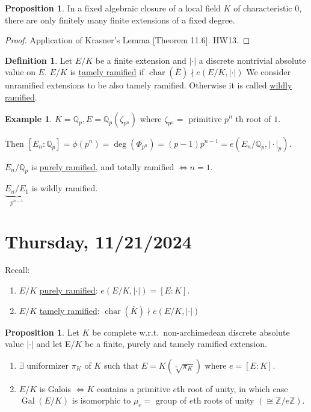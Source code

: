 \documentclass[openany]{amsbook}
\numberwithin{section}{chapter}
\theoremstyle{definition}
\newtheorem*{example}{Example}
\newtheorem*{definition}{Definition}
\newtheorem{proposition}[theorem]{Proposition}
\begin{document}
\begin{proposition}
    In a fixed algebraic closure of a local field \(K\) of characteristic \(0\), there are only finitely many finite extensions of a fixed degree.
\end{proposition}

\begin{proof}
    Application of Krasner's Lemma [Theorem 11.6]. HW13.
\end{proof}

\begin{definition}
    Let \(E / K\) be a finite extension and \(\vert \cdot \vert \) a discrete nontrivial absolute value on \(E\). \(E / K\) is \underline{tamely ramified} if \(\operatorname{char}(\overline{E}) \nmid e(E / K, \vert \cdot \vert)\) We consider unramified extensions to be also tamely ramified. Otherwise it is called \underline{wildly ramified}. 
\end{definition}

\begin{example}
    \(K = \mathbb{Q}_p, E = \mathbb{Q}_p(\zeta_{p^n})\) where \(\zeta_{p^n}=\) primitive \(p^n\) th root of \(1\).
    
    Then \([E_n:\mathbb{Q}_p] = \phi(p^n)=\deg(\Phi_{p^n})=(p-1)p^{n-1} = e(E_n / \mathbb{Q}_p, \vert \cdot \vert_p)\).
    
    \(E_n / \mathbb{Q}_p\) is \underline{purely ramified}, and totally ramified \(\iff n = 1\).

    \(\underbrace{E_n / E_1}_{p^{n-1}}\) is wildly ramified. 
\end{example}

\section*{Thursday, 11/21/2024}

Recall:

\begin{enumerate}[label=\roman*)]
    \item \(E / K\) \underline{purely ramified}: \(e(E / K, \vert \cdot \vert ) = [E:K]\).
    \item \(E / K\) \underline{tamely ramified}: \(\operatorname{char}(\overline{K}) \nmid e(E / K, \vert \cdot \vert)\)   
\end{enumerate} 

\begin{proposition}
    Let \(K\) be complete w.r.t.\ non-archimedean discrete absolute value \(\vert \cdot \vert \) and let E\( / K\) be a finite, purely and tamely ramified extension.
    
    \begin{enumerate}[label=\roman*)]
        \item \(\exists\) uniformizer \(\pi_K\) of \(K\) such that \(E = K(\sqrt[e]{\pi _K} )\) where \(e = [E:K]\).
        \item \(E / K\) is Galois \(\iff K\) contains a primitive \(e\)th root of unity, in which case \(\operatorname{Gal}(E / K)\) is isomorphic to \(\mu_e =\) group of \(e\)th roots of unity \((\cong \mathbb{Z} / e \mathbb{Z})\).  
    \end{enumerate} 
\end{proposition}
\end{document}
